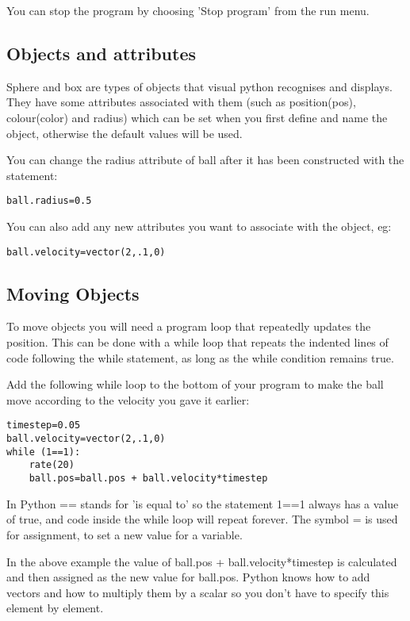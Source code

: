 \documentclass[a4paper]{letter}
\begin{document}
You can stop the program by choosing 'Stop program' from the run menu.

\subsection{Objects and attributes}
Sphere and box are types of objects that visual python recognises and displays. 
They have some attributes associated with them (such as 
position({\color{code}pos}), colour({\color{code}color}) and 
{\color{code}radius}) which can be set when you first define and name the object, 
otherwise the default values will be used. 

You can change the radius attribute of {\color{code}ball} after it has been constructed 
with the statement:
{\color{code}\begin{verbatim}
ball.radius=0.5 
\end{verbatim}}
You can also add any new attributes you want to associate with the object, eg: 
{\color{code}\begin{verbatim}
ball.velocity=vector(2,.1,0) 
\end{verbatim}}

\subsection{Moving Objects}
To move objects you will need a program loop that repeatedly updates the position. 
This can be done with a while loop that repeats the indented lines of code following 
the while statement, as long as the while condition remains true.

Add the following while loop to the bottom of your program to make the ball move according to the velocity you gave it earlier:
{\color{code}\begin{verbatim}
timestep=0.05 
ball.velocity=vector(2,.1,0) 
while (1==1):
    rate(20) 
    ball.pos=ball.pos + ball.velocity*timestep 
\end{verbatim}}
In Python {\small\color{code}==} stands for 'is equal to' 
so the statement {\small\color{code}1==1} always has a value of true,
 and code inside the while loop will repeat forever. 
The symbol {\small\color{code}=} is used for assignment, to set a new value for a variable. 

In the above example the value of {\color{code}ball.pos + ball.velocity*timestep} 
is calculated and then assigned as the new value for ball.pos. 
Python knows how to add vectors and how to multiply them by a scalar so you don't have 
to specify this element by element. 
\end{document}
